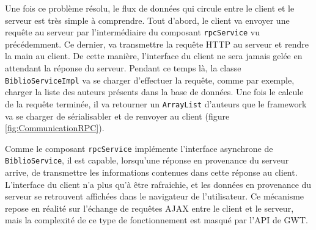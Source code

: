 Une fois ce problème résolu, le flux de données qui circule entre le client et le serveur est très simple à comprendre. Tout d'abord, le client va envoyer une requête au serveur par l'intermédiaire du composant \verb|rpcService| vu précédemment. Ce dernier, va transmettre la requête HTTP au serveur et rendre la main au client. De cette manière, l'interface du client ne sera jamais gelée en attendant la réponse du serveur. Pendant ce temps là, la classe \verb|BiblioServiceImpl| va se charger d'effectuer la requête, comme par exemple, charger la liste des auteurs présents dans la base de données. Une fois le calcule de la requête terminée, il va retourner un \verb|ArrayList| d'auteurs que le framework va se charger de sérialisabler et de renvoyer au client (figure \ref{fig:CommunicationRPC}).


Comme le composant \verb|rpcService| implémente l'interface asynchrone de \verb|BiblioService|, il est capable, lorsqu'une réponse en provenance du serveur arrive, de transmettre les informations contenues dans cette réponse au client. L'interface du client n'a plus qu'à être rafraichie, et les données en provenance du serveur se retrouvent affichées dans le navigateur de l'utilisateur. Ce mécanisme repose en réalité sur l'échange de requêtes AJAX entre le client et le serveur, mais la complexité de ce type de fonctionnement est masqué par l'API de GWT.